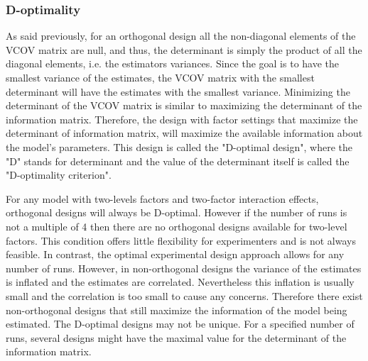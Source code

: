 \subsubsection{D-optimality}
As said previously, for an orthogonal design all the non-diagonal elements of the VCOV matrix are null,
and thus, the determinant is simply the product of all the diagonal elements, i.e. the estimators variances.
Since the goal is to have the smallest variance of the estimates, the VCOV matrix with the smallest determinant will have the 
estimates with the smallest variance. 
Minimizing the determinant of the VCOV matrix is similar to maximizing the determinant of the information matrix. 
Therefore, the design with factor settings that maximize the determinant of information matrix, 
will maximize the available information about the model's parameters. 
This design is called the "D-optimal design", 
where the "D" stands for determinant and the value of the determinant itself is called the "D-optimality criterion".

For any model with two-levels factors and two-factor interaction effects, orthogonal designs will always be D-optimal. 
However if the number of runs is not a multiple of 4 then there are no orthogonal designs available for two-level factors. 
This condition offers little flexibility for experimenters and is not always feasible. 
In contrast, the optimal experimental design approach allows for any number of runs. 
However, in non-orthogonal designs the variance of the estimates is inflated and the estimates are correlated. 
Nevertheless this inflation is usually small and the correlation is too small to cause any concerns.
Therefore there exist non-orthogonal designs that still maximize the information of the model being estimated.
The D-optimal designs may not be unique. For a specified number of runs,
 several designs might have the maximal value for the determinant of the information matrix.\\

